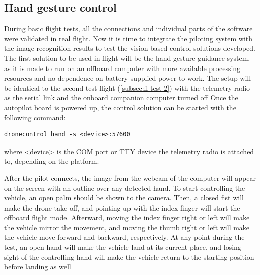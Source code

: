 \subsection{Hand gesture control}
\label{subsec:fl-test-4}


During basic flight tests, all the connections and individual parts of the software were validated in real flight.
Now it is time to integrate the piloting system with the image recognition results to test the vision-based control solutions developed.
The first solution to be used in flight will be the hand-gesture guidance system, as it is made to run on an offboard computer with more available processing resources and no dependence on battery-supplied power to work.
The setup will be identical to the second test flight (\ref{subsec:fl-test-2}) with the telemetry radio as the serial link and the onboard companion computer turned off
Once the autopilot board is powered up, the control solution can be started with the following command:
\begin{verbatim}
dronecontrol hand -s <device>:57600
\end{verbatim}
where <device> is the COM port or TTY device the telemetry radio is attached to, depending on the platform.


After the pilot connects, the image from the webcam of the computer will appear on the screen with an outline over any detected hand.
To start controlling the vehicle, an open palm should be shown to the camera.
Then, a closed fist will make the drone take off, and pointing up with the index finger will start the offboard flight mode.
Afterward, moving the index finger right or left will make the vehicle mirror the movement, 
and moving the thumb right or left will make the vehicle move forward and backward, respectively.
At any point during the test, an open hand will make the vehicle land at its current place, and losing sight of the controlling hand will make the vehicle return to the starting position before landing as well


